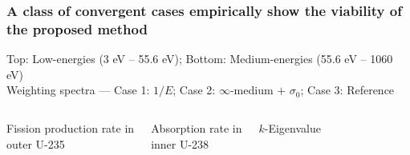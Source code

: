 \documentclass[compress,10pt]{beamer}
\begin{document}
\typeout{***********************************************************************************}

\begin{frame}
    \frametitle{A class of convergent cases empirically show the viability of the proposed method}

    \centering

    \vspace{-4mm}
    {\small Top: Low-energies (3 eV -- 55.6 eV); Bottom: Medium-energies (55.6 eV -- 1060 eV) } \\
    {\footnotesize Weighting spectra --- Case 1: $1/E$; Case 2: $\infty$-medium $+$ $\sigma_0$; Case 3: Reference} \\


    \begin{columns}[t]

        \centering

        {\footnotesize Fission production rate in\\ outer U-235}

        \centering

        {\footnotesize Absorption rate in\\ inner U-238}

        \centering

        {\footnotesize $k$-Eigenvalue}

    \end{columns}

    \begin{columns}[t]

        \centering


        \centering


        \centering


    \end{columns}


\end{frame}
\end{document}
